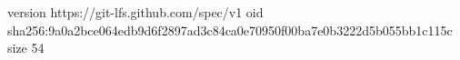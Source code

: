 version https://git-lfs.github.com/spec/v1
oid sha256:9a0a2bce064edb9d6f2897ad3c84ca0e70950f00ba7e0b3222d5b055bb1c115c
size 54
